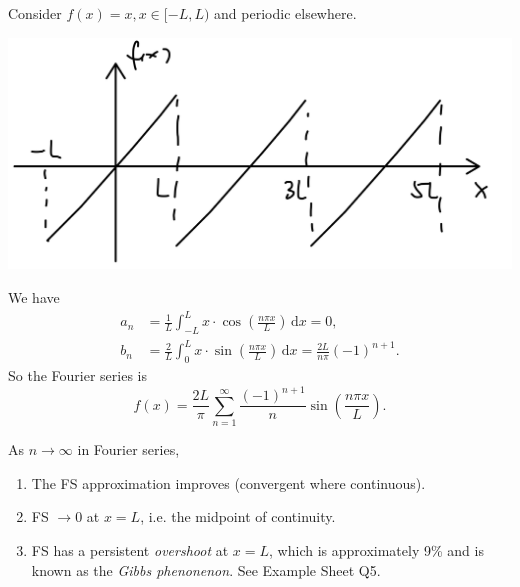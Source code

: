 \documentclass[a4paper]{article}
\begin{document}
\begin{example}
    Consider $f(x)=x,x\in [-L,L)$ and periodic elsewhere.
    \begin{center}
        \includegraphics[scale=0.1]{methods2.jpeg}
    \end{center}
    We have 
    \begin{align*}
        a_n &= \frac{1}{L}\int_{-L}^{L} x\cdot \cos \left( \frac{n\pi x}{L} \right) \,\mathrm{d}x=0,\\ 
        b_n &= \frac{2}{L} \int_{0}^{L} x\cdot \sin \left( \frac{n\pi x}{L} \right) \,\mathrm{d}x = \frac{2L}{n\pi }(-1)^{n+1}.
    \end{align*}
    So the Fourier series is 
    \begin{equation}
        f(x) = \frac{2L}{\pi } \sum_{n=1}^{\infty}\frac{(-1)^{n+1}}{n}\sin \left( \frac{n\pi x}{L} \right).
    \end{equation}
\end{example}
\begin{note}
    As $n\to \infty$ in Fourier series,
    \begin{enumerate}
        \item The FS approximation improves (convergent where continuous).
        \item FS $ \to 0 $ at $x=L$, i.e. the midpoint of continuity.
        \item FS has a persistent \textit{overshoot} at $x=L$, which is approximately 9\% and is known as the \textit{Gibbs phenonenon}. See Example Sheet Q5.
    \end{enumerate}
\end{note}
\end{document}
